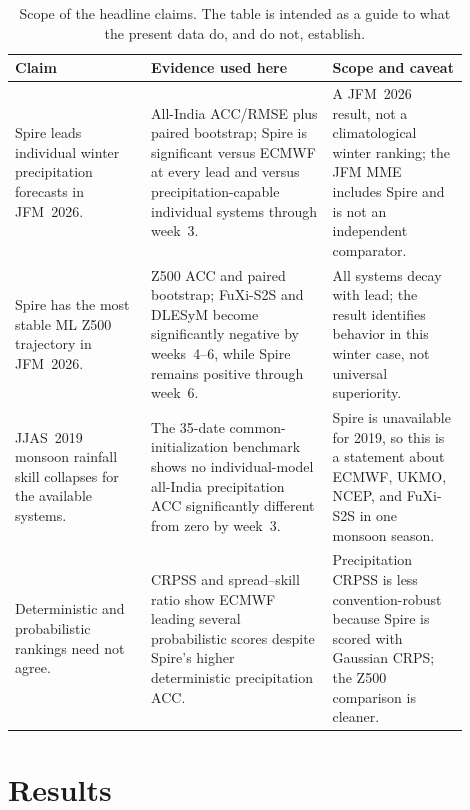 \documentclass[11pt,a4paper]{article}
\begin{document}
\begin{table}[t]
  \centering
  \caption{Scope of the headline claims. The table is intended as a guide to
  what the present data do, and do not, establish.}
  \label{tab:claim_scope}
  \footnotesize
  \setlength{\tabcolsep}{3pt}
  \begin{tabular}{>{\raggedright\arraybackslash}p{0.27\linewidth}
                  >{\raggedright\arraybackslash}p{0.36\linewidth}
                  >{\raggedright\arraybackslash}p{0.27\linewidth}}
    \toprule
    Claim & Evidence used here & Scope and caveat \\
    \midrule
    Spire leads individual winter precipitation forecasts in JFM~2026.
      & All-India ACC/RMSE plus paired bootstrap; Spire is significant versus
        ECMWF at every lead and versus precipitation-capable individual
        systems through week~3.
      & A JFM~2026 result, not a climatological winter ranking; the JFM MME
        includes Spire and is not an independent comparator. \\
    Spire has the most stable ML Z500 trajectory in JFM~2026.
      & Z500 ACC and paired bootstrap; FuXi-S2S and DLESyM become significantly
        negative by weeks~4--6, while Spire remains positive through week~6.
      & All systems decay with lead; the result identifies behavior in this
        winter case, not universal superiority. \\
    JJAS~2019 monsoon rainfall skill collapses for the available systems.
      & The 35-date common-initialization benchmark shows no individual-model
        all-India precipitation ACC significantly different from zero by
        week~3.
      & Spire is unavailable for 2019, so this is a statement about ECMWF,
        UKMO, NCEP, and FuXi-S2S in one monsoon season. \\
    Deterministic and probabilistic rankings need not agree.
      & CRPSS and spread--skill ratio show ECMWF leading several probabilistic
        scores despite Spire's higher deterministic precipitation ACC.
      & Precipitation CRPSS is less convention-robust because Spire is scored
        with Gaussian CRPS; the Z500 comparison is cleaner. \\
    \bottomrule
  \end{tabular}
\end{table}

\section{Results}\label{sec:results}
\end{document}
